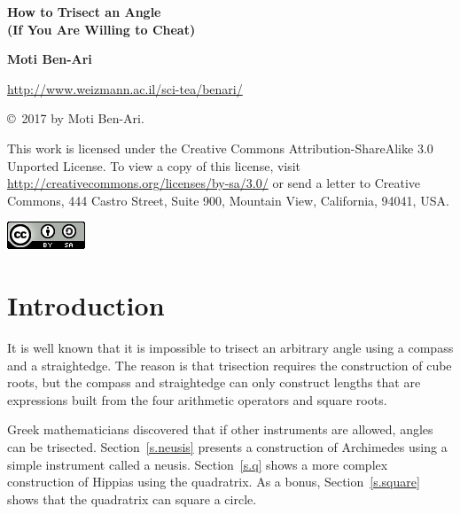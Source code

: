 \documentclass[11pt,a4paper]{article}
\newcommand*{\qd}{quadratrix}
\begin{document}
\thispagestyle{empty}

\begin{center}

\textbf{\huge How to Trisect an Angle\\\bigskip (If You Are Willing to Cheat)}

\bigskip
\bigskip

\textbf{\Large Moti Ben-Ari}

\bigskip

\url{http://www.weizmann.ac.il/sci-tea/benari/}

\end{center}

\begin{center}
\copyright{}\  2017 by Moti Ben-Ari.
\end{center}

{\small This work is licensed under the Creative Commons Attribution-ShareAlike 3.0 Unported License. To view a copy of this license, visit \url{http://creativecommons.org/licenses/by-sa/3.0/} or send a letter to Creative Commons, 444 Castro Street, Suite 900, Mountain View, California, 94041, USA.}
\begin{center}
\includegraphics[width=.15\textwidth]{../by-sa.png}
\end{center}

\bigskip


\section{Introduction}

It is well known that it is impossible to trisect an arbitrary angle using a compass and a straightedge. The reason is that trisection requires the construction of cube roots, but the compass and straightedge can only construct lengths that are expressions built from the four arithmetic operators and square roots.

Greek mathematicians discovered that if other instruments are allowed, angles can be trisected. Section~\ref{s.neusis} presents a construction of Archimedes using a simple instrument called a neusis. Section~\ref{s.q} shows a more complex construction of Hippias using the \qd{}. As a bonus, Section~\ref{s.square} shows that the \qd{} can square a circle.
\end{document}

